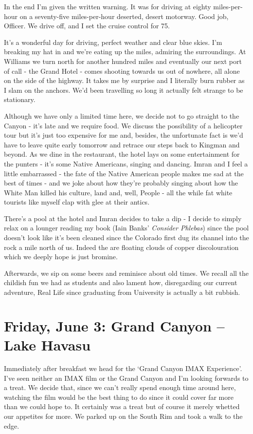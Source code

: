 \documentclass[a5paper,titlepage,11pt]{book}
\begin{document}
In the end I'm given the written warning.  It was for driving at eighty miles-per-hour on a seventy-five miles-per-hour deserted, desert motorway.  Good job, Officer.  We drive off, and I set the cruise control for 75.

It's a wonderful day for driving, perfect weather and clear blue skies.  I'm breaking my hat in and we're eating up the miles, admiring the surroundings.  At Williams we turn north for another hundred miles and eventually our next port of call - the Grand Hotel - comes shooting towards us out of nowhere, all alone on the side of the highway.  It takes me by surprise and I literally burn rubber as I slam on the anchors.  We'd been travelling so long it actually felt strange to be stationary.

Although we have only a limited time here, we decide not to go straight to the Canyon - it's late and we require food.  We discuss the possibility of a helicopter tour but it's just too expensive for me and, besides, the unfortunate fact is we'd have to leave quite early tomorrow and retrace our steps back to Kingman and beyond.  As we dine in the restaurant, the hotel lays on some entertainment for the punters - it's some Native Americans, singing and dancing.  Imran and I feel a little embarrassed - the fate of the Native American people makes me sad at the best of times - and we joke about how they're probably singing about how the White Man killed his culture, land and, well, People - all the while fat white tourists like myself clap with glee at their antics.

There's a pool at the hotel and Imran decides to take a dip - I decide to simply relax on a lounger reading my book (Iain Banks' \emph{Consider Phlebas}) since the pool doesn't look like it's been cleaned since the Colorado first dug its channel into the rock a mile north of us.  Indeed the are floating clouds of copper discolouration which we deeply hope is just bromine.

Afterwards, we sip on some beers and reminisce about old times.  We recall all the childish fun we had as students and also lament how, disregarding our current adventure, Real Life since graduating from University is actually a bit rubbish.

\chapter[Grand Canyon -- Lake Havasu]{Friday, June 3: Grand Canyon -- Lake Havasu}
Immediately after breakfast we head for the `Grand Canyon IMAX Experience'.  I've seen neither an IMAX film or the Grand Canyon and I'm looking forwards to a treat.  We decide that, since we can't really spend enough time around here, watching the film would be the best thing to do since it could cover far more than we could hope to. It certainly was a treat but of course it merely whetted our appetites for more.  We parked up on the South Rim and took a walk to the edge.
\end{document}
